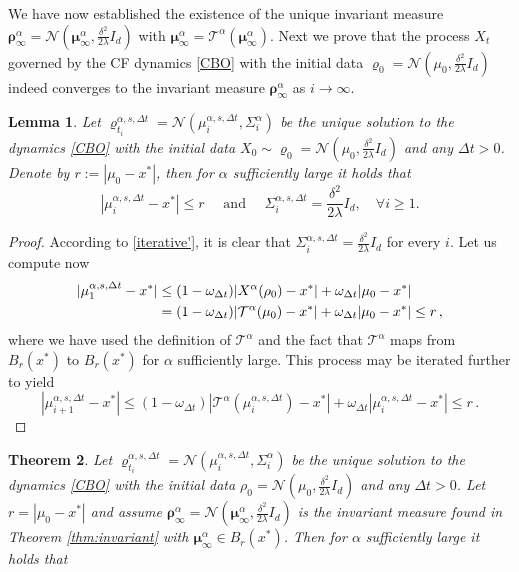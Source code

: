 \documentclass[reqno]{amsart}
\numberwithin{algorithm}{section}
\newcommand{\Xalpha}{{X^\alpha}}
\newcommand{\mTa}{{\mathcal T}^\alpha}
\newcommand{\mc}[1]{\mathcal{#1}}
\newtheorem{theorem}{Theorem}[section]
\newtheorem{lemma}[theorem]{Lemma}
\begin{document}
{We have now established the existence of the unique invariant measure $\boldsymbol\rho_\infty^\alpha=\mc{N}(\boldsymbol\mu_\infty^\alpha,\frac{\delta^2}{2\lambda}I_d)$ with $\boldsymbol\mu_\infty^\alpha=\mc{T}^\alpha(\boldsymbol\mu_\infty^\alpha)$. Next we prove that the process $X_t$ governed by the CF dynamics \eqref{CBO} with the initial data $\varrho_0=\mc{N}(\mu_0,\frac{\delta^2}{2\lambda}I_d)$ indeed converges to the invariant measure $\boldsymbol\rho_\infty^\alpha$ as $i\to \infty $.
\begin{lemma}\label{lem: stay in ball}
     Let $\varrho_{t_i}^{\alpha,s,\Delta t}=\mc{N}(\mu_i^{\alpha,s,\Delta t}, \Sigma_i^\alpha)$ be the unique solution to the dynamics \eqref{CBO} with the initial data $X_0\sim \varrho_0=\mc{N}(\mu_0,\frac{\delta^2}{2\lambda}I_d)$ and any $\Delta t>0$. Denote by  $r:=|\mu_0-x^*|$, then for $\alpha$ sufficiently large it holds that
     \begin{equation}
         |\mu_i^{\alpha,s,\Delta t}-x^*|\leq r\quad \mbox{ and }\quad \Sigma_i^{\alpha,s,\Delta t}= \frac{\delta^2}{2\lambda}I_d,\quad \forall i\geq 1.
     \end{equation}
\end{lemma}
\begin{proof}
    According to \eqref{iterative'}, it is clear that $\Sigma_i^{\alpha,s,\Delta t} =\frac{\delta^2}{2\lambda}I_d$ for every $i$. Let us compute now
    \begin{align}
        |\mu_1^{\alpha,s,\Delta t} -x^*|&\leq (1-\omega_{\Delta t})|\Xalpha(\rho_0)-x^*|+\omega_{\Delta t}|\mu_0-x^*|\notag\\
        &=(1-\omega_{\Delta t})|\mc{T}^\alpha(\mu_0)-x^*|+\omega_{\Delta t}|\mu_0-x^*|\leq r\,,
    \end{align}
    where we have used the definition of $\mTa$ and the fact that $\mTa$ maps from $B_r(x^*)$ to $B_r(x^*)$ for $\alpha$ sufficiently large. This process may be iterated further to yield
    \begin{equation}
    |\mu_{i+1}^{\alpha,s,\Delta t} -x^*|\leq (1-\omega_{\Delta t})|\mc{T}^\alpha(\mu_i^{\alpha,s,\Delta t})-x^*|+\omega_{\Delta t}|\mu_i^{\alpha,s,\Delta t}-x^*|\leq r\,.
    \end{equation}
\end{proof}
\begin{theorem}
    Let $\varrho_{t_i}^{\alpha,s,\Delta t}=\mc{N}(\mu_i^{\alpha,s,\Delta t}, \Sigma_i^\alpha)$ be the unique solution to the dynamics \eqref{CBO} with the initial data $\rho_0=\mc{N}(\mu_0,\frac{\delta^2}{2\lambda}I_d)$ and any $\Delta t>0$. Let $r=|\mu_0-x^*|$ and assume  $\boldsymbol\rho_\infty^\alpha=\mc{N}(\boldsymbol\mu_\infty^\alpha,\frac{\delta^2}{2\lambda}I_d)$ is the invariant measure found in Theorem \ref{thm:invariant} with $\boldsymbol\mu_\infty^\alpha\in B_r(x^*)$. Then for $\alpha$ sufficiently large it holds that

\end{theorem}}
\end{document}

